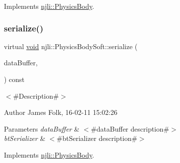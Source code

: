 Implements \mbox{\hyperlink{classnjli_1_1_physics_body_a832ed4f79a2b52b334d63d094364f86a}{njli\+::\+Physics\+Body}}.

\mbox{\label{classnjli_1_1_physics_body_soft_a7e38c5df16551787c35fc55c1335ddf1}} 
\subsubsection{\texorpdfstring{serialize()}{serialize()}}
{\footnotesize\ttfamily virtual \mbox{\hyperlink{_thread_8h_af1e856da2e658414cb2456cb6f7ebc66}{void}} njli\+::\+Physics\+Body\+Soft\+::serialize (\begin{DoxyParamCaption}\item[{\mbox{\hyperlink{_thread_8h_af1e856da2e658414cb2456cb6f7ebc66}{void}} $\ast$}]{data\+Buffer,  }\item[{bt\+Serializer $\ast$}]{ }\end{DoxyParamCaption}) const\hspace{0.3cm}{\ttfamily [virtual]}}



$<$\#\+Description\#$>$ 

\begin{DoxyAuthor}{Author}
James Folk, 16-\/02-\/11 15\+:02\+:26
\end{DoxyAuthor}

\begin{DoxyParams}{Parameters}
{\em data\+Buffer} & $<$\#data\+Buffer description\#$>$ \\
\hline
{\em bt\+Serializer} & $<$\#bt\+Serializer description\#$>$ \\
\hline
\end{DoxyParams}


Implements \mbox{\hyperlink{classnjli_1_1_physics_body_a3c40378e7f3033557ec6adf9428b6a9d}{njli\+::\+Physics\+Body}}.

\mbox{\label{classnjli_1_1_physics_body_soft_ac84a68c18afab8bf7cabdf51461d52fb}} 

